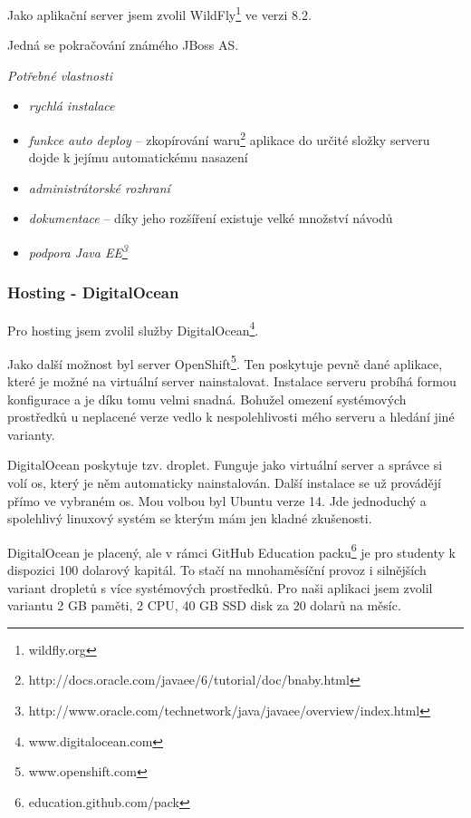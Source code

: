 \documentclass[thesis=B,czech]{FITthesis}[2012/06/26]
\begin{document}
Jako aplikační server jsem zvolil WildFly\footnote{wildfly.org} ve verzi 8.2.\newline

Jedná se pokračování známého JBoss AS\cite{wildfly}.\newline

\textit{Potřebné vlastnosti} 
\begin{itemize}[nosep]
	\item \textit{rychlá instalace}
	\item \textit{funkce auto deploy} -- zkopírování waru\footnote{http://docs.oracle.com/javaee/6/tutorial/doc/bnaby.html} aplikace do určité složky serveru dojde k jejímu automatickému nasazení
	\item \textit{administrátorské rozhraní}
	\item \textit{dokumentace} -- díky jeho rozšíření existuje velké množství návodů  
	\item \textit{podpora Java EE\footnote{http://www.oracle.com/technetwork/java/javaee/overview/index.html}}
\end{itemize}

\subsubsection{Hosting - DigitalOcean}

Pro hosting jsem zvolil služby DigitalOcean\footnote{www.digitalocean.com}.

Jako další možnost byl server OpenShift\footnote{www.openshift.com}. Ten poskytuje pevně dané aplikace, které je možné na virtuální server nainstalovat. Instalace serveru probíhá formou konfigurace a je díku tomu velmi snadná. Bohužel omezení systémových prostředků u neplacené verze vedlo k nespolehlivosti mého serveru a hledání jiné varianty. 

DigitalOcean poskytuje tzv. droplet. Funguje jako virtuální server a správce si volí \acrshort{os}, který je něm automaticky nainstalován. Další instalace se už provádějí přímo ve vybraném \acrshort{os}. Mou volbou byl Ubuntu verze 14. Jde jednoduchý a spolehlivý linuxový systém se kterým mám jen kladné zkušenosti. 

DigitalOcean je placený, ale v rámci GitHub Education packu\footnote{education.github.com/pack} je pro studenty k dispozici 100 dolarový kapitál. To stačí na mnohaměsíční provoz i silnějších variant dropletů s více systémových prostředků. Pro naši aplikaci jsem zvolil variantu 2 GB paměti, 2 CPU, 40 GB SSD disk za 20 dolarů na měsíc.  
\end{document}
